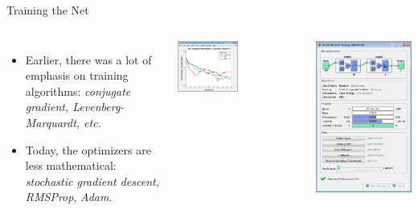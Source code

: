 \documentclass[10pt, aspectratio=169]{beamer} %
\begin{document}
\begin{frame}{Training the Net}
	\begin{columns}
	\begin{itemize}
		\item Earlier, there was a lot of emphasis on training algorithms: \emph{conjugate gradient, Levenberg-Marquardt, etc.}
		\item Today, the optimizers are less mathematical: \emph{stochastic gradient descent}, \emph{RMSProp}, \emph{Adam}.
	\end{itemize}
	\centerline{\includegraphics[width=0.5\textwidth]{nn_toolbox_training_error.png}}
	\includegraphics[width=\textwidth]{nn_toolbox.png}
	\end{columns}
\end{frame}
\end{document}
